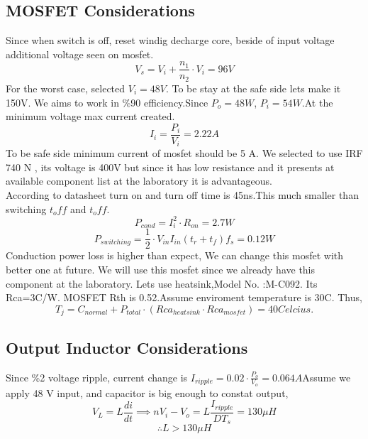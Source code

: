 \documentclass{article}
\begin{document}
\subsection{MOSFET Considerations}
Since when switch is off, reset windig decharge core, beside of input voltage additional voltage seen on mosfet.
\begin{equation}
    V_s=V_i+\frac{n_1}{n_2}\cdot V_i=96 V
\end{equation}
For the worst case, selected $V_i=48V$. To be stay at the safe side lets make it 150V.
We aims to work in \%90 efficiency.Since $P_o=48 W$, $P_i=54 W$.At the minimum voltage max current created.
\begin{equation}
    I_i=\frac{P_i}{V_i}=2.22 A
\end{equation}
To be safe side minimum current of mosfet should be 5 A.
We selected to use IRF 740 N \cite{mosfet}, its voltage is 400V but since it has low resistance and it presents at available component list at the laboratory it is advantageous.
\\According to datasheet turn on and turn off time is 45ns.This much smaller than switching $t_off$ and $t_off$.
\begin{equation}
    P_{cond}=I_{i}^2\cdot R_{on}=2.7 W
\end{equation}
\begin{equation}
    P_{switching}=\frac{1}{2}\cdot V_{in}I_{in}(t_r+t_f)f_s=0.12W
\end{equation}
Conduction power loss is higher than expect, We can change this mosfet with better one at future. We will use this mosfet since we already have this component at the laboratory.
Lets use heatsink,Model No. :M-C092. Its Rca=3C/W. MOSFET Rth is 0.52.Assume enviroment temperature is 30C. Thus,
\begin{equation}
    T_j=C_{normal}+P_{total}\cdot (Rca_{heatsink}\cdot Rca_{mosfet})=40 Celcius.
\end{equation}
\subsection{Output Inductor Considerations}
Since \%2 voltage ripple, current change is $I_{ripple}=0.02\cdot \frac{P_o}{V_o}=0.064 A$Assume we apply 48 V input, and capacitor is big enough to constat output,
\begin{equation}
    V_L=L\frac{di}{dt} \implies nV_i-V_o=L\frac{I_{ripple}}{DT_s}=130\mu H
\end{equation}
\[\therefore L>130\mu H\]
\end{document}
